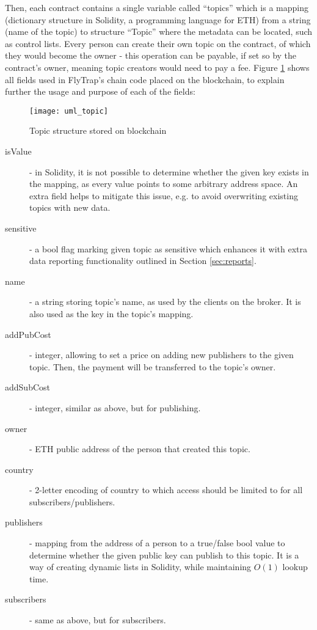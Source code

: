 Then, each contract contains a single variable called ``topics'' which is a mapping (dictionary structure in Solidity, a programming language for ETH) from a string (name of the topic) to structure ``Topic'' where the metadata can be located, such as control lists. Every person can create their own topic on the contract, of which they would become the owner - this operation can be payable, if set so by the contract's owner, meaning topic creators would need to pay a fee. Figure \ref{fig:uml_topic} shows all fields used in FlyTrap's chain code placed on the blockchain, to explain further the usage and purpose of each of the fields:
\begin{figure}[h]
    \centering
    \texttt{[image: uml\_topic]}
    \caption{Topic structure stored on blockchain}
    \label{fig:uml_topic}
\end{figure}
\begin{description}
    \item[isValue] - in Solidity, it is not possible to determine whether the given key exists in the mapping, as every value points to some arbitrary address space. An extra field helps to mitigate this issue, e.g. to avoid overwriting existing topics with new data.
    \item[sensitive] - a bool flag marking given topic as sensitive which enhances it with extra data reporting functionality outlined in Section \ref{sec:reports}.
    \item[name] - a string storing topic's name, as used by the clients on the broker. It is also used as the key in the topic's mapping.
    \item[addPubCost] - integer, allowing to set a price on adding new publishers to the given topic. Then, the payment will be transferred to the topic's owner.
    \item[addSubCost] - integer, similar as above, but for publishing.
    \item[owner] - ETH public address of the person that created this topic.
    \item[country] - 2-letter encoding of country to which access should be limited to for all subscribers/publishers.
    \item[publishers] - mapping from the address of a person to a true/false bool value to determine whether the given public key can publish to this topic. It is a way of creating dynamic lists in Solidity, while maintaining $O(1)$ lookup time.
    \item[subscribers] - same as above, but for subscribers.
\end{description}

